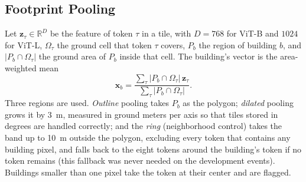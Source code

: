 \documentclass[journal]{IEEEtran}
\begin{document}
\subsection{Footprint Pooling}
Let $\mathbf{z}_\tau\in\mathbb{R}^{D}$ be the feature of token $\tau$ in a tile, with $D=768$ for ViT-B and $1024$ for ViT-L, $\Omega_\tau$ the ground cell that token $\tau$ covers, $P_b$ the region of building $b$, and $|P_b\cap \Omega_\tau|$ the ground area of $P_b$ inside that cell. The building's vector is the area-weighted mean
\begin{equation}
\mathbf{x}_b=\frac{\sum_{\tau}|P_b\cap \Omega_\tau|\,\mathbf{z}_\tau}{\sum_{\tau}|P_b\cap \Omega_\tau|}.
\label{eq:pool}
\end{equation}
Three regions are used. \emph{Outline} pooling takes $P_b$ as the polygon; \emph{dilated} pooling grows it by 3~m, measured in ground meters per axis so that tiles stored in degrees are handled correctly; and the \emph{ring} (neighborhood control) takes the band up to 10~m outside the polygon, excluding every token that contains any building pixel, and falls back to the eight tokens around the building's token if no token remains (this fallback was never needed on the development events). Buildings smaller than one pixel take the token at their center and are flagged.
\end{document}
